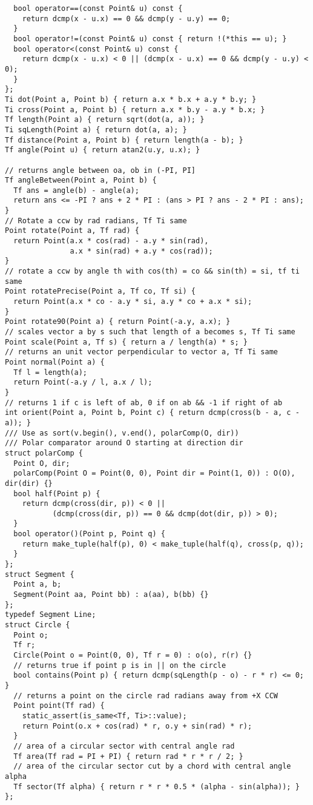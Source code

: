 \documentclass[FSZ,a4paper,onesided]{article}
\begin{document}
\begin{multicols*}{\COLS}
\begin{lstlisting}
  bool operator==(const Point& u) const {
    return dcmp(x - u.x) == 0 && dcmp(y - u.y) == 0;
  }
  bool operator!=(const Point& u) const { return !(*this == u); }
  bool operator<(const Point& u) const {
    return dcmp(x - u.x) < 0 || (dcmp(x - u.x) == 0 && dcmp(y - u.y) < 0);
  }
};
Ti dot(Point a, Point b) { return a.x * b.x + a.y * b.y; }
Ti cross(Point a, Point b) { return a.x * b.y - a.y * b.x; }
Tf length(Point a) { return sqrt(dot(a, a)); }
Ti sqLength(Point a) { return dot(a, a); }
Tf distance(Point a, Point b) { return length(a - b); }
Tf angle(Point u) { return atan2(u.y, u.x); }

// returns angle between oa, ob in (-PI, PI]
Tf angleBetween(Point a, Point b) {
  Tf ans = angle(b) - angle(a);
  return ans <= -PI ? ans + 2 * PI : (ans > PI ? ans - 2 * PI : ans);
}
// Rotate a ccw by rad radians, Tf Ti same
Point rotate(Point a, Tf rad) {
  return Point(a.x * cos(rad) - a.y * sin(rad),
               a.x * sin(rad) + a.y * cos(rad));
}
// rotate a ccw by angle th with cos(th) = co && sin(th) = si, tf ti same
Point rotatePrecise(Point a, Tf co, Tf si) {
  return Point(a.x * co - a.y * si, a.y * co + a.x * si);
}
Point rotate90(Point a) { return Point(-a.y, a.x); }
// scales vector a by s such that length of a becomes s, Tf Ti same
Point scale(Point a, Tf s) { return a / length(a) * s; }
// returns an unit vector perpendicular to vector a, Tf Ti same
Point normal(Point a) {
  Tf l = length(a);
  return Point(-a.y / l, a.x / l);
}
// returns 1 if c is left of ab, 0 if on ab && -1 if right of ab
int orient(Point a, Point b, Point c) { return dcmp(cross(b - a, c - a)); }
/// Use as sort(v.begin(), v.end(), polarComp(O, dir))
/// Polar comparator around O starting at direction dir
struct polarComp {
  Point O, dir;
  polarComp(Point O = Point(0, 0), Point dir = Point(1, 0)) : O(O), dir(dir) {}
  bool half(Point p) {
    return dcmp(cross(dir, p)) < 0 ||
           (dcmp(cross(dir, p)) == 0 && dcmp(dot(dir, p)) > 0);
  }
  bool operator()(Point p, Point q) {
    return make_tuple(half(p), 0) < make_tuple(half(q), cross(p, q));
  }
};
struct Segment {
  Point a, b;
  Segment(Point aa, Point bb) : a(aa), b(bb) {}
};
typedef Segment Line;
struct Circle {
  Point o;
  Tf r;
  Circle(Point o = Point(0, 0), Tf r = 0) : o(o), r(r) {}
  // returns true if point p is in || on the circle
  bool contains(Point p) { return dcmp(sqLength(p - o) - r * r) <= 0; }
  // returns a point on the circle rad radians away from +X CCW
  Point point(Tf rad) {
    static_assert(is_same<Tf, Ti>::value);
    return Point(o.x + cos(rad) * r, o.y + sin(rad) * r);
  }
  // area of a circular sector with central angle rad
  Tf area(Tf rad = PI + PI) { return rad * r * r / 2; }
  // area of the circular sector cut by a chord with central angle alpha
  Tf sector(Tf alpha) { return r * r * 0.5 * (alpha - sin(alpha)); }
};
\end{lstlisting}

\end{multicols*}
\end{document}
